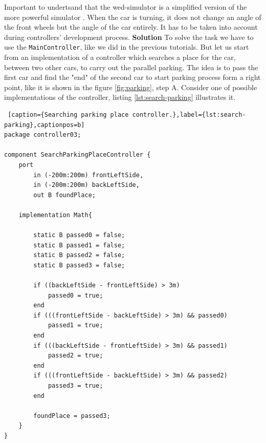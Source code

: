 Important to undertsand that the wed-simulator is a simplified version of the more powerful simulator \cite{GKR17}. When the car is turning, it does not change an angle of the front wheels but the angle of the car entirely. It has to be taken into account during controllers' development process.\newpage
\textbf{Solution} \newline \newline
To solve the task we have to use the \texttt{MainController}, like we did in the previous tutorials. But let us start from an implementation of a controller which searches a place for the car, between two other cars, to carry out the parallel parking. The idea is to pass the first car and find the "end" of the second car to start parking process form a right point, like it is shown in the figure \ref{fig:parking}, step A. Consider one of possible implementations of the controller, listing \ref{lst:search-parking} illustrates it.
\bigskip
\begin{lstlisting} [caption={Searching parking place controller.},label={lst:search-parking},captionpos=b]
package controller03;

component SearchParkingPlaceController {
    port
        in (-200m:200m) frontLeftSide,
        in (-200m:200m) backLeftSide,
        out B foundPlace;

    implementation Math{
        
        static B passed0 = false;
        static B passed1 = false;
        static B passed2 = false;
        static B passed3 = false;

        if ((backLeftSide - frontLeftSide) > 3m)
            passed0 = true;
        end
        if (((frontLeftSide - backLeftSide) > 3m) && passed0)
            passed1 = true;
        end
        if (((backLeftSide - frontLeftSide) > 3m) && passed1)
            passed2 = true;
        end
        if (((frontLeftSide - backLeftSide) > 3m) && passed2)
            passed3 = true;
        end
        
        foundPlace = passed3;
    }
}    
\end{lstlisting}
\bigskip
